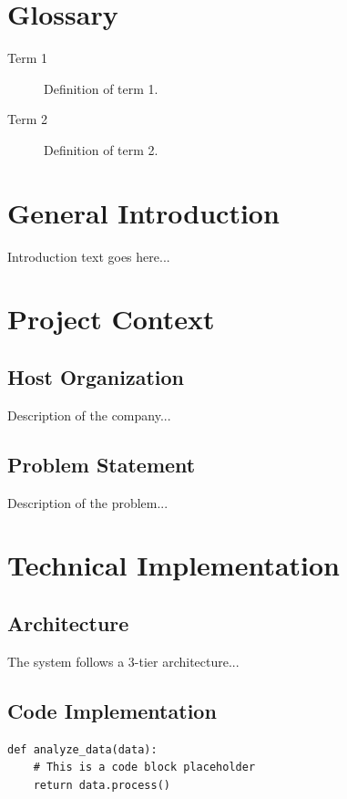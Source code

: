 \documentclass[12pt,a4paper]{report}
\begin{document}
\chapter*{Glossary}
\begin{description}
    \item[Term 1] Definition of term 1.
    \item[Term 2] Definition of term 2.
\end{description}
\newpage

\tabledematieres %
\tableofcontents
\listoffigures
\listoftables
\newpage

\setcounter{page}{1}

\chapter*{General Introduction}
Introduction text goes here...

\chapter{Project Context}
\section{Host Organization}
Description of the company...
\section{Problem Statement}
Description of the problem...

\chapter{Technical Implementation}
\section{Architecture}
The system follows a 3-tier architecture...

\section{Code Implementation}
\begin{verbatim}
def analyze_data(data):
    # This is a code block placeholder
    return data.process()
\end{verbatim}
\end{document}
